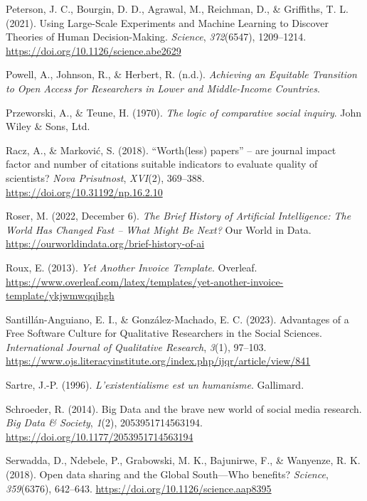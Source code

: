 \documentclass[
  letterpaper,
  DIV=11,
  numbers=noendperiod]{scrreprt}
\newlength{\cslhangindent}
\newenvironment{CSLReferences}[2] %
 {\begin{list}{}{%
  \setlength{\itemindent}{0pt}
  \setlength{\leftmargin}{0pt}
  \setlength{\parsep}{0pt}
  \ifodd #1
   \setlength{\leftmargin}{\cslhangindent}
   \setlength{\itemindent}{-1\cslhangindent}
  \fi
  \setlength{\itemsep}{#2\baselineskip}}}
 {\end{list}}
\begin{document}
\begin{CSLReferences}{1}{0}
Peterson, J. C., Bourgin, D. D., Agrawal, M., Reichman, D., \&
Griffiths, T. L. (2021). Using {Large-Scale Experiments} and {Machine
Learning} to {Discover Theories} of {Human Decision-Making}.
\emph{Science}, \emph{372}(6547), 1209--1214.
\url{https://doi.org/10.1126/science.abe2629}

Powell, A., Johnson, R., \& Herbert, R. (n.d.). \emph{Achieving an
{Equitable Transition} to {Open Access} for {Researchers} in {Lower} and
{Middle-Income Countries}}.

Przeworski, A., \& Teune, H. (1970). \emph{The logic of comparative
social inquiry}. John Wiley \& Sons, Ltd.

Racz, A., \& Marković, S. (2018). {``{Worth}(less) papers''} -- are
journal impact factor and number of citations suitable indicators to
evaluate quality of scientists? \emph{Nova Prisutnost}, \emph{XVI}(2),
369--388. \url{https://doi.org/10.31192/np.16.2.10}

Roser, M. (2022, December 6). \emph{The {Brief History} of {Artificial
Intelligence}: {The World Has Changed Fast} -- {What Might Be Next}?}
Our World in Data. \url{https://ourworldindata.org/brief-history-of-ai}

Roux, E. (2013). \emph{Yet {Another Invoice Template}}. Overleaf.
\url{https://www.overleaf.com/latex/templates/yet-another-invoice-template/ykjwmwqqjhgh}

Santillán-Anguiano, E. I., \& González-Machado, E. C. (2023). Advantages
of a {Free Software Culture} for {Qualitative Researchers} in the
{Social Sciences}. \emph{International Journal of Qualitative Research},
\emph{3}(1), 97--103.
\url{https://www.ojs.literacyinstitute.org/index.php/ijqr/article/view/841}

Sartre, J.-P. (1996). \emph{L'existentialisme est un humanisme}.
Gallimard.

Schroeder, R. (2014). Big {Data} and the brave new world of social media
research. \emph{Big Data \& Society}, \emph{1}(2), 2053951714563194.
\url{https://doi.org/10.1177/2053951714563194}

Serwadda, D., Ndebele, P., Grabowski, M. K., Bajunirwe, F., \& Wanyenze,
R. K. (2018). Open data sharing and the {Global South}---{Who} benefits?
\emph{Science}, \emph{359}(6376), 642--643.
\url{https://doi.org/10.1126/science.aap8395}


\end{CSLReferences}
\end{document}
